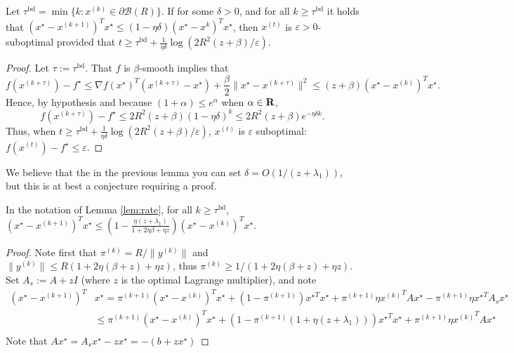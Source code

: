 \documentclass[11pt]{article}
\let\epsilon\varepsilon
\begin{document}
\begin{lem}\label{lem:rate}
  Let $\tau^{\mathrm{bd}} = \min \{ k : x^{(k)} \in \partial \mathcal{B}(R)\}$. If for some $\delta  > 0$, and for all
  $k \geq \tau^{\mathrm{bd}}$ it holds that $(x^\star - x^{(k + 1)})^T x^\star \leq (1 - \eta \delta)(x^\star - x^{k})^T x^\star$, then
  $x^{(t)}$ is $\epsilon > 0$-suboptimal
  provided that $t \geq \tau^{\mathrm{bd}} +  \frac{1}{\eta \delta}\log(2 R^2(z + \beta)/\epsilon)$. 
\end{lem}
\begin{proof}
  Let $\tau := \tau^{\mathrm{bd}}$. That $f$ is $\beta$-smooth implies that
  \[
  f(x^{(k +\tau)}) - f^\star \leq \nabla f(x^\star)^T(x^{(k + \tau)} - x^\star) + \frac{\beta}{2}\|x^\star - x^{(k + \tau)}\|^2
  \leq (z + \beta) (x^\star - x^{(k)})^T x^\star. 
  \]
  Hence, by hypothesis and because $(1 + \alpha) \leq e^{\alpha}$ when $\alpha \in \mathbf{R}$,
  \[
  f(x^{(k + \tau)}) - f^\star \leq 2R^2 (z + \beta)(1 - \eta \delta)^k  \leq 2R^2 (z + \beta) e^{-\eta \delta k}.
  \] 
  Thus, when $t \geq \tau^{\mathrm{bd}} +  \frac{1}{\eta \delta}\log(2 R^2(z + \beta)/\epsilon)$, $x^{(t)}$ is
  $\epsilon$ suboptimal: $f(x^{(t)}) - f^\star \leq \epsilon$. 
\end{proof}
We believe that the in the previous lemma you can set $\delta = O(1/(z + \lambda_1))$, but this is at best a conjecture requiring a proof.
\begin{lem}\label{conj:rate}
  In the notation of Lemma \ref{lem:rate}, for all $k \geq \tau^{\mathrm{bd}}$,
  $(x^{\star} - x^{(k+1)})^T x^\star \leq \left(1 - \frac{\eta (z + \lambda_1)}{1 + 2\eta \beta +\eta z}\right)(x^\star - x^{(k)})^T x^\star$. 
\end{lem}
\begin{proof}
  Note first that $\pi^{(k)} = R/\|y^{(k)}\|$ and $\|y^{(k)}\| \leq R(1 + 2\eta(\beta +z) + \eta z)$, thus
  $\pi^{(k)} \geq 1/(1 + 2\eta (\beta + z) + \eta z)$. Set $A_s := A + zI$ (where $z$ is the optimal Lagrange multiplier), and note
  \begin{align*}
    (x^\star - x^{(k + 1)})^T &x^\star = \pi^{(k+1)}(x^\star - x^{(k)})^T x^\star + (1 - \pi^{(k + 1)}){x^\star}^T x^\star
    + \pi^{(k + 1)}\eta {x^{(k)}}^T A x^\star - \pi^{(k + 1)}\eta {x^\star}^TA_s x^\star\\
    &\leq \pi^{(k+1)}(x^\star - x^{(k)})^T x^\star + (1 - \pi^{(k + 1)}(1 + \eta (z + \lambda_1))){x^\star}^T x^\star
    + \pi^{(k + 1)}\eta {x^{(k)}}^T A x^\star \\
  \end{align*}
  Note that $Ax^\star = A_s x^\star - zx^\star = -(b + zx^\star)$
\end{proof}

\end{document}
